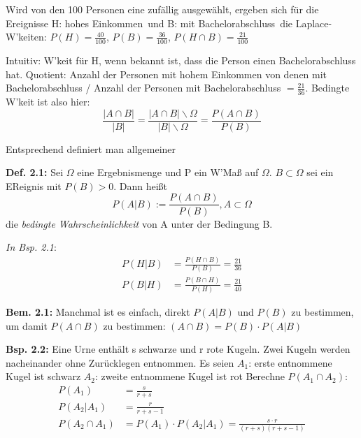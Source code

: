 \documentclass[a4paper,11pt]{article}
\begin{document}
\noindent Wird von den 100 Personen eine zufällig ausgewählt, ergeben sich für die Ereignisse 
H: \glqq hohes Einkommen\grqq\ und B: \glqq mit Bachelorabschluss\grqq\ die Laplace-W'keiten:
\newline $P(H)=\frac{40}{100}$, $P(B)=\frac{36}{100}$, $P(H\cap B)=\frac{21}{100}$

\vspace{4pt}
\noindent Intuitiv: W'keit für H, wenn bekannt ist, dass die Person einen Bachelorabschluss hat.
\newline Quotient: Anzahl der Personen mit hohem Einkommen von denen mit Bachelorabschluss / Anzahl der Personen mit Bachelorabschluss $=\frac{21}{36}$. Bedingte W'keit ist also hier:
\[\frac{|A\cap B|}{|B|}=\frac{|A\cap B|\backslash\Omega}{|B|\backslash\Omega}=\frac{P(A\cap B)}{P(B)}\]

\vspace{6pt}
\noindent Entsprechend definiert man allgemeiner

\vspace{6pt}
\noindent\textbf{Def. 2.1:} Sei $\Omega$ eine Ergebnismenge und P ein W'Maß auf $\Omega$. $B\subset\Omega$ sei ein EReignis mit $P(B)>0$. Dann heißt 
\[P(A|B):=\frac{P(A\cap B)}{P(B)}, A\subset\Omega\]
die \textit{bedingte Wahrscheinlichkeit} von A unter der Bedingung B.

\vspace{6pt}
\noindent\textit{In Bsp. 2.1}:
\begin{align*}
P(H|B) &=\frac{P(H\cap B)}{P(B)}=\frac{21}{36}\\
P(B|H) &=\frac{P(B\cap H)}{P(H)}=\frac{21}{40}
\end{align*}

\vspace{6pt}
\noindent\textbf{Bem. 2.1:} Manchmal ist es einfach, direkt $P(A|B)$ und $P(B)$ zu bestimmen, um damit $P(A\cap B)$ zu bestimmen: $(A\cap B)=P(B) \cdot P(A|B)$

\vspace{6pt}
\noindent\textbf{Bsp. 2.2:} Eine Urne enthält s schwarze und r rote Kugeln. 
Zwei Kugeln werden nacheinander ohne Zurücklegen entnommen. Es seien
\newline $A_1$: \glqq erste entnommene Kugel ist schwarz\grqq
\newline $A_2$: \glqq zweite entnommene Kugel ist rot\grqq
\newline Berechne $P(A_1\cap A_2)$:
\begin{align*}
P(A_1)&=\frac{s}{r+s}\\
P(A_2|A_1)&=\frac{r}{r+s-1}\\
P(A_2\cap A_1)&= P(A_1)\cdot P(A_2|A_1)=\frac{s\cdot r}{(r+s)(r+s-1)}
\end{align*}
\end{document}
